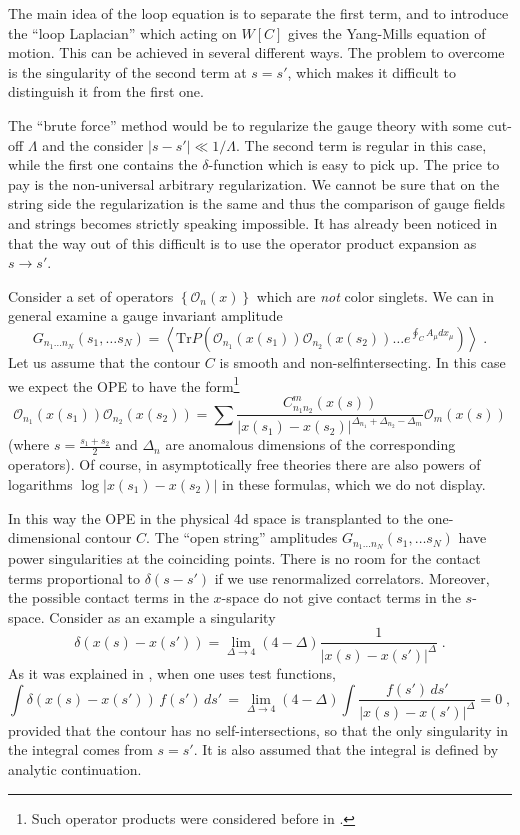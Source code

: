 \documentclass[a4paper,12pt]{article}
\numberwithin{equation}{section}
\begin{document}
The main idea of the loop equation is to separate the first term, and to introduce
the ``loop Laplacian'' which acting on \( W[C] \) gives the Yang-Mills equation
of motion. This can be achieved in several different ways. The problem to overcome
is the singularity of the second term at \( s=s' \), which makes it difficult
to distinguish it from the first one.

The ``brute force'' method would be to regularize the gauge theory with some
cut-off \( \Lambda  \) and the consider \( |s-s'|\ll 1/\Lambda  \). The second
term is regular in this case, while the first one contains the \( \delta  \)-function
which is easy to pick up. The price to pay is the non-universal arbitrary regularization.
We cannot be sure that on the string side the regularization is the same and
thus the comparison of gauge fields and strings becomes strictly speaking impossible.
It has already been noticed in \cite{6} that the way out of this difficult
is to use the operator product expansion as \( s\to s' \). 

Consider a set of operators \( \left\{ \mathcal{O}_{n}(x)\right\}  \) which
are \emph{not} color singlets. We can in general examine a gauge invariant amplitude
\[
G_{n_{1}\ldots n_{N}}(s_{1},\ldots s_{N})=\left\langle \textrm{Tr}P\left( \mathcal{O}_{n_{1}}(x(s_{1}))\mathcal{O}_{n_{2}}(x(s_{2}))\ldots e^{\oint _{C}A_{\mu }dx_{\mu }}\right) \right\rangle \; .\]
 Let us assume that the contour \( C \) is smooth and non-selfintersecting.
In this case we expect the OPE to have the form\footnote{%
Such operator products were considered before in \cite{16}.
}
\begin{equation}
\label{2.4}
\mathcal{O}_{n_{1}}(x(s_{1}))\mathcal{O}_{n_{2}}(x(s_{2}))=\sum \frac{C^{m}_{n_{1}n_{2}}(x(s))}{\left| x(s_{1})-x(s_{2})\right| ^{\Delta _{n_{1}}+\Delta _{n_{2}}-\Delta _{m}}}\mathcal{O}_{m}(x(s))
\end{equation}
 (where \( s=\frac{s_{1}+s_{2}}{2} \) and \( \Delta _{n} \) are anomalous
dimensions of the corresponding operators). Of course, in asymptotically free
theories there are also powers of logarithms \( \log \left| x(s_{1})-x(s_{2})\right|  \)
in these formulas, which we do not display.

In this way the OPE in the physical 4d space is transplanted to the one-dimensional
contour \( C \). The ``open string'' amplitudes \( G_{n_{1}\ldots n_{N}}(s_{1},\ldots s_{N}) \)
have power singularities at the coinciding points. There is no room for the
contact terms proportional to \( \delta (s-s') \) if we use renormalized correlators.
Moreover, the possible contact terms in the \( x \)-space do not give contact
terms in the \( s \)-space. Consider as an example a singularity
\[
\delta (x(s)-x(s'))=\lim _{\Delta \to 4}(4-\Delta )\frac{1}{|x(s)-x(s')|^{\Delta }}\; .\]
 As it was explained in \cite{6}, when one uses test functions,
\[
\int \delta (x(s)-x(s'))\, f(s')\, ds'\, =\lim _{\Delta \to 4}(4-\Delta )\int \frac{f(s')\, ds'}{|x(s)-x(s')|^{\Delta }}=0\; ,\]
 provided that the contour has no self-intersections, so that the only singularity
in the integral comes from \( s=s' \). It is also assumed that the integral
is defined by analytic continuation.
\end{document}

